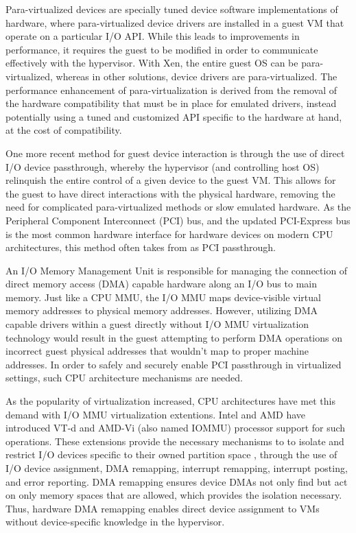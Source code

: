 Para-virtualized devices are specially tuned device software implementations of hardware, where para-virtualized device drivers are installed in a guest VM that operate on a particular I/O API.  While this leads to improvements in performance, it requires the guest to be modified in order to communicate effectively with the hypervisor. With Xen, the entire guest OS can be para-virtualized, whereas in other solutions, device drivers are para-virtualized. The performance enhancement of para-virtualization is derived from the removal of the hardware compatibility that must be in place for emulated drivers, instead potentially using a tuned and customized API specific to the hardware at hand, at the cost of compatibility.  

One more recent method for guest device interaction is through the use of direct I/O device passthrough, whereby the hypervisor (and controlling host OS) relinquish the entire control of a given device to the guest VM.  This allows for the guest to have direct interactions with the physical hardware, removing the need for complicated para-virtualized methods or slow emulated hardware.  As the Peripheral Component Interconnect (PCI) bus, and the updated PCI-Express bus is the most common hardware interface for hardware devices on modern CPU architectures, this method often takes from as PCI passthrough.  

An I/O Memory Management Unit  is responsible for managing the connection of direct memory access (DMA) capable hardware along an I/O bus to main memory. Just like a CPU MMU, the I/O MMU maps device-visible virtual memory addresses to physical memory addresses. However, utilizing DMA capable drivers within a guest directly without I/O MMU virtualization technology would result in the guest attempting to perform DMA operations on incorrect guest physical addresses that wouldn't map to proper machine addresses. In order to safely and securely enable PCI passthrough in virtualized settings, such CPU architecture mechanisms are needed. 

As the popularity of virtualization increased, CPU architectures have met this demand with I/O MMU virtualization extentions. Intel and AMD have introduced VT-d and AMD-Vi (also named IOMMU) processor support for such operations.  These extensions provide the necessary mechanisms to to isolate and restrict I/O devices specific to their owned partition space \cite{abramson2006vtd}, through the use of I/O device assignment, DMA remapping, interrupt remapping, interrupt posting, and error reporting. DMA remapping ensures device DMAs not only find but act on only memory spaces that are allowed, which provides the isolation necessary. Thus, hardware DMA remapping enables direct device assignment to VMs without device-specific knowledge in the hypervisor. 

